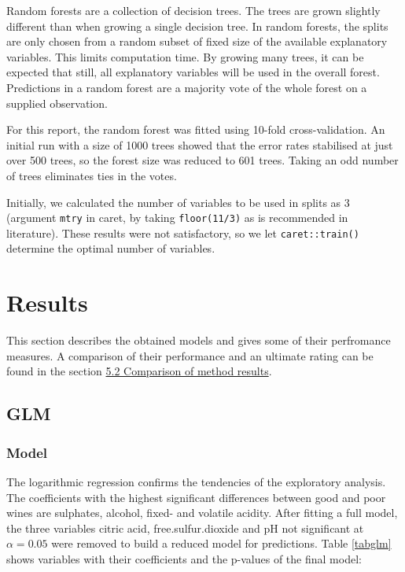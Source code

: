 \documentclass[11pt,]{article}
\begin{document}
Random forests are a collection of decision trees. The trees are grown
slightly different than when growing a single decision tree. In random
forests, the splits are only chosen from a random subset of fixed size
of the available explanatory variables. This limits computation time. By
growing many trees, it can be expected that still, all explanatory
variables will be used in the overall forest. Predictions in a random
forest are a majority vote of the whole forest on a supplied
observation.

For this report, the random forest was fitted using 10-fold
cross-validation. An initial run with a size of 1000 trees showed that
the error rates stabilised at just over 500 trees, so the forest size
was reduced to 601 trees. Taking an odd number of trees eliminates ties
in the votes.

Initially, we calculated the number of variables to be used in splits as
3 (argument \texttt{mtry} in caret, by taking \texttt{floor(11/3)} as is
recommended in literature). These results were not satisfactory, so we
let \texttt{caret::train()} determine the optimal number of variables.

\hypertarget{results}{%
\section{Results}\label{results}}

This section describes the obtained models and gives some of their
perfromance measures. A comparison of their performance and an ultimate
rating can be found in the section
\protect\hyperlink{comparison-of-method-results}{5.2 Comparison of
method results}.

\hypertarget{glm-1}{%
\subsection{GLM}\label{glm-1}}

\hypertarget{model}{%
\subsubsection{Model}\label{model}}

The logarithmic regression confirms the tendencies of the exploratory
analysis. The coefficients with the highest significant differences
between good and poor wines are sulphates, alcohol, fixed- and volatile
acidity. After fitting a full model, the three variables citric acid,
free.sulfur.dioxide and pH not significant at \(\alpha = 0.05\) were
removed to build a reduced model for predictions. Table \ref{tabglm}
shows variables with their coefficients and the p-values of the final
model:
\end{document}

